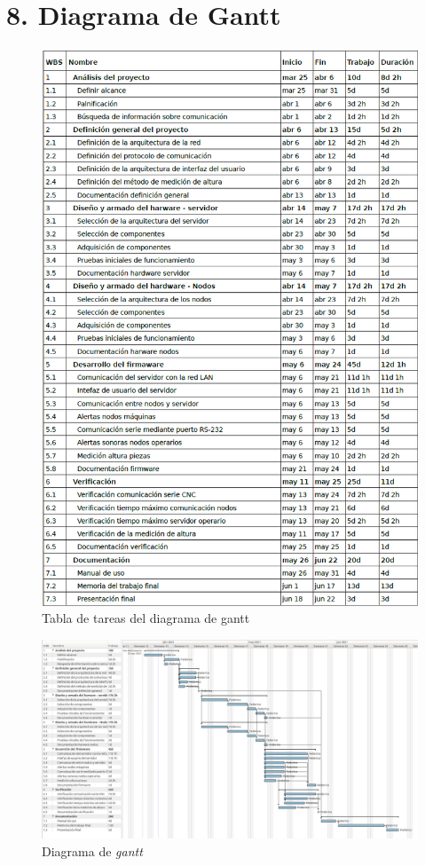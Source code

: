 \documentclass[11pt]{charter}
\begin{document}
\section{8. Diagrama de Gantt}
\label{sec:gantt}
\begin{figure}[htpb]
\centering 
\includegraphics[scale=0.7]{Figuras/tareasGantt.png}
\caption{Tabla de tareas del diagrama de gantt}
\label{fig:tareasGantt}
\end{figure}

\begin{landscape}
\begin{figure}[htpb]
\centering 
\includegraphics[scale=0.6]{Figuras/gantt.png}
\caption{Diagrama de \textit{gantt}}
\label{fig:gantt}
\end{figure}
\end{landscape}
\end{document}
